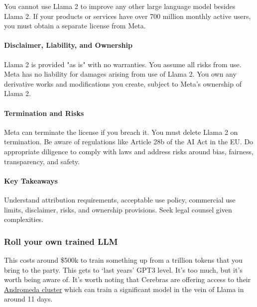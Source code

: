 You cannot use Llama 2 to improve any other large language model besides Llama 2.
If your products or services have over 700 million monthly active users, you must obtain a separate license from Meta.
\paragraph{Disclaimer, Liability, and Ownership}

Llama 2 is provided "as is" with no warranties. You assume all risks from use.
Meta has no liability for damages arising from use of Llama 2.
You own any derivative works and modifications you create, subject to Meta's ownership of Llama 2.
\paragraph{Termination and Risks}

Meta can terminate the license if you breach it. You must delete Llama 2 on termination.
Be aware of regulations like Article 28b of the AI Act in the EU. Do appropriate diligence to comply with laws and address risks around bias, fairness, transparency, and safety.
\paragraph{Key Takeaways}

Understand attribution requirements, acceptable use policy, commercial use limits, disclaimer, risks, and ownership provisions.
Seek legal counsel given complexities.

\subsubsection{Roll your own trained LLM}
This costs around \$500k to train something up from a trillion tokens that you bring to the party. This gets to `last years' GPT3 level. It's too much, but it's worth being aware of. It's worth noting that Cerebras are offering access to their \href{https://www.cerebras.net/press-release/cerebras-unveils-andromeda-a-13.5-million-core-ai-supercomputer-that-delivers-near-perfect-linear-scaling-for-large-language-models}{Andromeda cluster} which can train a significant model in the vein of Llama in around 11 days. 
